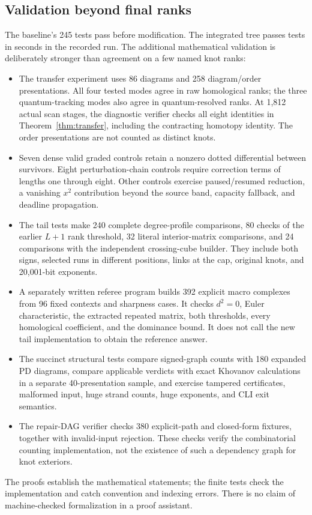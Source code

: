 \subsection{Validation beyond final ranks}

The baseline's 245 tests pass before modification. The integrated tree passes \FinalTestCount{} tests in \FinalTestSeconds{} seconds in the recorded run. The additional mathematical validation is deliberately stronger than agreement on a few named knot ranks:
\begin{itemize}
\item The transfer experiment uses 86 diagrams and 258 diagram/order presentations. All four tested modes agree in raw homological ranks; the three quantum-tracking modes also agree in quantum-resolved ranks. At 1,812 actual scan stages, the diagnostic verifier checks all eight identities in Theorem~\ref{thm:transfer}, including the contracting homotopy identity. The order presentations are not counted as distinct knots.
\item Seven dense valid graded controls retain a nonzero dotted differential between survivors. Eight perturbation-chain controls require correction terms of lengths one through eight. Other controls exercise paused/resumed reduction, a vanishing $x^2$ contribution beyond the source band, capacity fallback, and deadline propagation.
\item The tail tests make 240 complete degree-profile comparisons, 80 checks of the earlier $L+1$ rank threshold, 32 literal interior-matrix comparisons, and 24 comparisons with the independent crossing-cube builder. They include both signs, selected runs in different positions, links at the cap, original knots, and 20,001-bit exponents.
\item A separately written referee program builds 392 explicit macro complexes from 96 fixed contexts and sharpness cases. It checks $d^2=0$, Euler characteristic, the extracted repeated matrix, both thresholds, every homological coefficient, and the dominance bound. It does not call the new tail implementation to obtain the reference answer.
\item The succinct structural tests compare signed-graph counts with 180 expanded PD diagrams, compare applicable verdicts with exact Khovanov calculations in a separate 40-presentation sample, and exercise tampered certificates, malformed input, huge strand counts, huge exponents, and CLI exit semantics.
\item The repair-DAG verifier checks 380 explicit-path and closed-form fixtures, together with invalid-input rejection. These checks verify the combinatorial counting implementation, not the existence of such a dependency graph for knot exteriors.
\end{itemize}
The proofs establish the mathematical statements; the finite tests check the implementation and catch convention and indexing errors. There is no claim of machine-checked formalization in a proof assistant.

